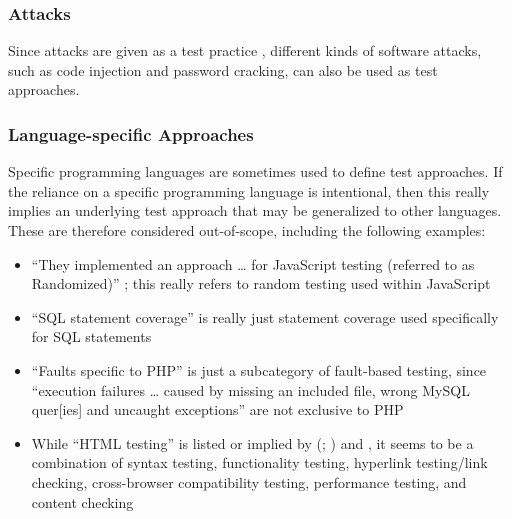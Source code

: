     \subsubsection{Attacks}
    \label{attacks}
    Since attacks are given as a test practice \citep[p.~34]{IEEE2022}, different
    kinds of software attacks, such as code injection and password cracking, can
    also be used as test approaches.

    \subsubsection{Language-specific Approaches}
    \label{lang-test}
    Specific programming languages are sometimes used to define test approaches.
    If the reliance on a specific programming language is intentional, then
    this really implies an underlying test approach that may be generalized to
    other languages. These are therefore considered out-of-scope,
    including the following examples:

    \begin{itemize}
        \item ``They implemented an approach \dots{} for JavaScript testing
              (referred to as Randomized)'' \citep[p.~192]{DoğanEtAl2014};
              this really refers to random testing used within JavaScript
        \item ``SQL statement coverage'' is really just statement coverage
              used specifically for SQL statements \citep[Tab.~13]{DoğanEtAl2014}
        \item ``Faults specific to PHP'' is just a subcategory of fault-based
              testing, since ``execution failures \dots{} caused by missing an
              included file, wrong MySQL quer[ies] and uncaught exceptions''
              are not exclusive to PHP \citep[Tab.~27]{DoğanEtAl2014}
        \item While ``HTML testing'' is listed or implied by
              \citeauthor{Gerrard2000a} (\citeyear[Tab.~2]{Gerrard2000a};
              \citeyear[Tab.~1, p.~3]{Gerrard2000b}) and
              \citet[p.~220]{Patton2006}, it seems to be a combination of syntax
              testing, functionality testing, hyperlink testing/link checking,
              cross-browser compatibility testing, performance testing, and
              content checking \citep[p.~3]{Gerrard2000b}
    \end{itemize}

